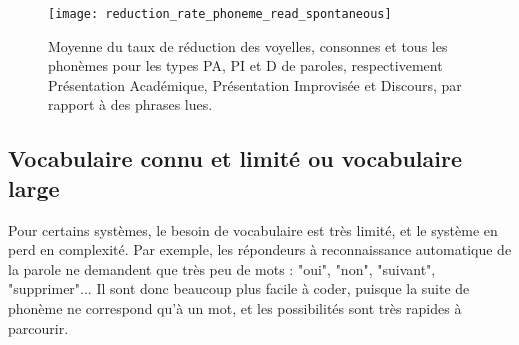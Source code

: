 	\begin{figure}[H]
		\begin{center}
			\texttt{[image: reduction\_rate\_phoneme\_read\_spontaneous]}
			\caption{Moyenne du taux de réduction des voyelles, consonnes et tous les phonèmes pour les types PA, PI et D de paroles, respectivement Présentation Académique, Présentation Improvisée et Discours, par rapport à des phrases lues. \cite{read-spontaneous}}
			\label{reduction_rate_phoneme_read_spontaneous}
		\end{center}
	\end{figure}
	
	\subsection{Vocabulaire connu et limité ou vocabulaire large}
	Pour certains systèmes, le besoin de vocabulaire est très limité, et le système en perd en complexité. Par exemple, les répondeurs à reconnaissance automatique de la parole ne demandent que très peu de mots : "oui", "non", "suivant", "supprimer"... Il sont donc beaucoup plus facile à coder, puisque la suite de phonème ne correspond qu'à un mot, et les possibilités sont très rapides à parcourir.
	
